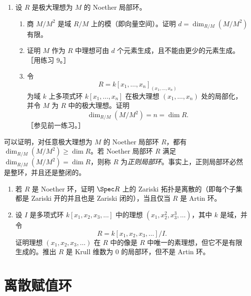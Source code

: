 \begin{enumerate}[label=\arabic*.]
\begin{enumerate}[label=(\alph*)]
    \item 证明 $d_t(R_1)=d_t(R)=m$ 且 $d_p(R_1)=d_p(R)$。推出我们可以假设 $R=R_1$。［用上升定理与下降定理（参见第 15.3 节定理 26）证明第二个等式。］
    \item 当 $R=R_1$ 时，通过给出一条长度为 $m$ 的显式素理想链，证明 $d_p(R)\geq d_t(R)$。
    \item 当 $R=R_1$ 时，证明 $R$ 的任意非零素理想都包含某个元素 $f$，使得 $R/(f)$ 在 $k$ 上的超越次数为 $d_t(R)-1$。用归纳法证明 $d_p(R)\leq d_t(R)$，并推出 $d_p(R)=d_t(R)$。
  \end{enumerate}
  \item 设 $R$ 是极大理想为 $M$ 的 Noether 局部环。
  \begin{enumerate}[label=(\alph*)]
    \item 商 $M/M^2$ 是域 $R/M$ 上的模（即向量空间）。证明 $d=\dim_{R/M}(M/M^2)$ 有限。
    \item 证明 $M$ 作为 $R$ 中理想可由 $d$ 个元素生成，且不能由更少的元素生成。［用练习 9。］
    \item 令
    \[
      R=k[x_1,\ldots,x_n]_{(x_1,\ldots,x_n)}
    \]
    为域 $k$ 上多项式环 $k[x_1,
    \ldots,x_n]$ 在极大理想 $(x_1,
    \ldots,x_n)$ 处的局部化，并令 $M$ 为 $R$ 中的极大理想。证明
    \[
      \dim_{R/M}(M/M^2)=n=\dim R.
    \]
    ［参见前一练习。］
  \end{enumerate}
\end{enumerate}

可以证明，对任意极大理想为 $M$ 的 Noether 局部环 $R$，都有 $\dim_{R/M}(M/M^2)\geq\dim R$。若 Noether 局部环 $R$ 满足 $\dim_{R/M}(M/M^2)=\dim R$，则称 $R$ 为\emph{正则局部环}。事实上，正则局部环必然是整环，并且还是整闭的。

\begin{enumerate}[label=\arabic*.,resume]
  \item 若 $R$ 是 Noether 环，证明 $\Spec R$ 上的 Zariski 拓扑是离散的（即每个子集都是 Zariski 开的并且也是 Zariski 闭的），当且仅当 $R$ 是 Artin 环。
  \item 设 $I$ 是多项式环 $k[x_1,x_2,x_3,
  \ldots]$ 中的理想 $(x_1,x_2^2,x_3^3,
  \ldots)$，其中 $k$ 是域，并令
  \[
    R=k[x_1,x_2,x_3,
    \ldots]/I.
  \]
  证明理想 $(x_1,x_2,x_3,
  \ldots)$ 在 $R$ 中的像是 $R$ 中唯一的素理想，但它不是有限生成的。推出 $R$ 是 Krull 维数为 $0$ 的局部环，但不是 Artin 环。
\end{enumerate}

\section{离散赋值环}

